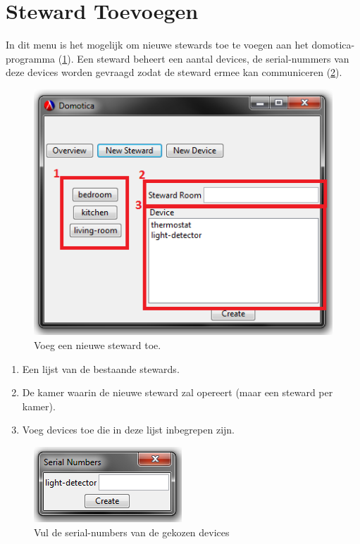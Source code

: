 \documentclass{article}
\begin{document}
	\section{Steward Toevoegen}
	\label{add-steward}
	In dit menu is het mogelijk om nieuwe stewards toe te voegen aan het domotica-programma (\ref{new-steward}). Een steward beheert een aantal devices, de serial-nummers van deze devices worden gevraagd zodat de steward ermee kan communiceren (\ref{new-steward-confirmation}).
	
	\begin{figure}
		\begin{center}
			\includegraphics{screenshot/new-steward.png}
		\end{center}
		\caption{Voeg een nieuwe steward toe.}
		\label{new-steward}
	\end{figure}
	
	\begin{enumerate}
		\item Een lijst van de bestaande stewards.
		\item De kamer waarin de nieuwe steward zal opereert (maar een steward per kamer).
		\item Voeg devices toe die in deze lijst inbegrepen zijn.
	\end{enumerate}
	
	\begin{figure}
		\begin{center}
			\includegraphics{screenshot/new-steward-confirmation.png}
		\end{center}
		\caption{Vul de serial-numbers van de gekozen devices}
		\label{new-steward-confirmation}
	\end{figure}
\end{document}
